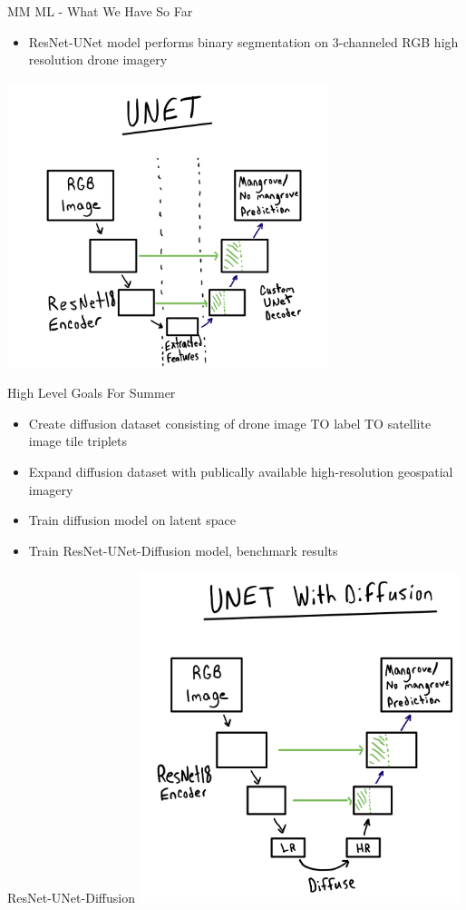 \begin{frame}{MM ML - What We Have So Far}
    \begin{itemize}
        \item ResNet-UNet model performs binary segmentation on 3-channeled RGB high resolution drone imagery
    \end{itemize}
    \includegraphics[height=0.7\textheight,width=0.7\textwidth,keepaspectratio]{images/unet}
\end{frame}

\begin{frame}{High Level Goals For Summer}
  \begin{itemize}
      \item Create diffusion dataset consisting of drone image TO label TO satellite image tile triplets
      \item Expand diffusion dataset with publically available high-resolution geospatial imagery
      \item Train diffusion model on latent space
      \item Train ResNet-UNet-Diffusion model, benchmark results
  \end{itemize}
\end{frame}

\begin{frame}{ResNet-UNet-Diffusion}
    \centering
    \includegraphics[height=0.7\textheight,width=0.7\textwidth,keepaspectratio]{images/unet-diffusion}
\end{frame}

